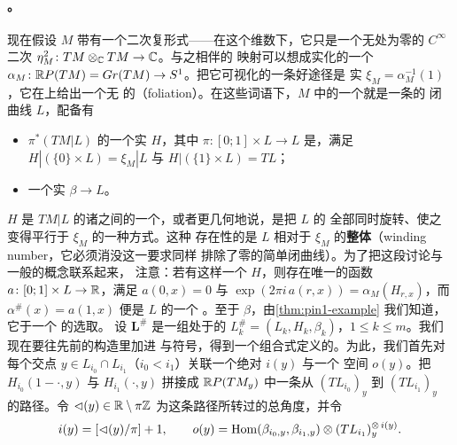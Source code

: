\paragraph{\trBraneStructure。}\label{sub:brane-structures}
现在假设 $M$ 带有一个二次复\trVolume{}形式——在这个维数下，它只是一个无处为零的%
$C^\infty$ 二次\trDifferential{} $\eta_M^2\colon TM\otimes_{\mathbb{C}} TM\to\mathbb{C}$。与之相伴的%
\trSquaredPhase{}映射可以想成实\trProjective{}化\trTangentBundle{}的一个%
\trTrivialization{} $\alpha_M\colon\mathbb{R}P(TM)=Gr(TM)\to S^1$。把它可视化的一条好途径是%
实\trSubbundle{} $\xi_M=\alpha_M^{-1}(1)$，它在\trSurface{}上给出一个无\trOrientation{}%
的\textbf{\trFoliation}（foliation）。在这些词语下，$M$ 中的一个\trLagrange\trBrane{}就是一条\trEmbedding{}的%
闭曲线 $L$，配备有
\begin{itemize}
\item \trPullback{} $\pi^*(TM|L)$ 的一个实\trSubbundle{} $H$，其中
$\pi\colon[0;1]\times L\to L$ 是\trProjection，满足 $H|(\{0\}\times L)=\xi_M|L$ 与%
$H|(\{1\}\times L)=TL$；
\item 一个实\trLineBundle{} $\beta\to L$。
\end{itemize}
$H$ 是 $TM|L$ 的诸\trSubbundle{}之间的一个\trHomotopy，或者更几何地说，是把 $L$ 的%
全部\trTangentSpace{}同时旋转、使之变得平行于 $\xi_M$ 的一种方式。这种\trHomotopy{}%
存在性的\trObstruction{}是 $L$ 相对于 $\xi_M$ 的\textbf{整体\trRotationNumber{}}（winding number，它必须消没这一要求同样%
排除了零\trHomology{}的简单闭曲线）。为了把这段讨论与一般的\trGrading{}概念联系起来，%
注意：若有这样一个 $H$，则存在唯一的函数 $a\colon[0;1]\times L\to\mathbb{R}$，满足 $a(0,x)=0$%
与 $\exp(2\pi i\,a(r,x))=\alpha_M(H_{r,x})$，而 $\alpha^{\#}(x)=a(1,x)$ 便是 $L$ 的一个%
\trGrading。至于 $\beta$，由\cref{thm:pin1-example} 我们知道，它\trEquivalence{}于一个%
\trPinStructure{}的选取。
设 $\boldsymbol{L}^{\#}$ 是一组处于\trGeneralPosition{}的\trExactLagrangianBrane{}
$L_k^{\#}=(L_k,H_k,\beta_k)$，$1\le k\le m$。我们现在要往先前的构造里加进\trGrading{}%
与符号，得到一个组合式定义的\trDirected{}\trACategory。为此，我们首先对每个交点%
$y\in L_{i_0}\cap L_{i_1}$（$i_0<i_1$）关联一个绝对\trIndex{} $i(y)$ 与一个%
\trOrientation{}空间 $o(y)$。把\trHomotopy{} $H_{i_0}(1-\cdot,y)$ 与 $H_{i_1}(\cdot,y)$%
拼接成 $\mathbb{R}P(TM_y)$ 中一条从 $(TL_{i_0})_y$ 到 $(TL_{i_1})_y$ 的路径。令%
${\lhd}(y)\in\mathbb{R}\setminus\pi\mathbb{Z}$ 为这条路径所转过的总角度，并令
\begin{equation}\label{eq:combinatorial-index-orientation}
i(y)=[{\lhd}(y)/\pi]+1,\qquad
o(y)=\operatorname{Hom}(\beta_{i_0,y},\beta_{i_1,y})\otimes(TL_{i_1})_y^{\otimes\,i(y)}.
\end{equation}
